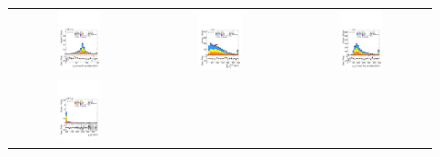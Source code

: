 \begin{figure}[htbp]
\begin{tabular}{@{}c c c@{}}
    \includegraphics[width=0.33\textwidth]{images/plots_modelling_run2_run3_variables/run_3_tth/plot_mWbest_hh_tth_22_23_24.pdf} &
    \includegraphics[width=0.33\textwidth]{images/plots_modelling_run2_run3_variables/run_3_tth/plot_SumPtBjet_hh_tth_22_23_24.pdf} &
    \includegraphics[width=0.33\textwidth]{images/plots_modelling_run2_run3_variables/run_3_tth/plot_mTopWbest_hh_tth_22_23_24.pdf} \\[4pt]
    \includegraphics[width=0.33\textwidth]{images/plots_modelling_run2_run3_variables/run_3_tth/plot_ditau_pt_hh_tth_22_23_24.pdf} &

\end{tabular}
\end{figure}

